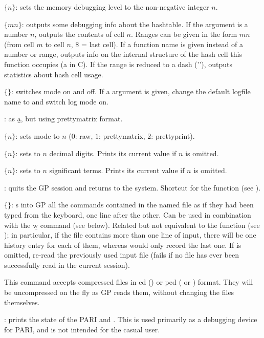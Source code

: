  $\{n\}$: sets the memory debugging level 
to the non-negative integer $n$.

 $\{m$\kbd{-}$n\}$: outputs some debugging info about the
hashtable. If the argument is a number $n$, outputs the contents of cell
$n$. Ranges can be given in the form $m$\kbd{-}$n$ (from cell $m$ to cell
$n$, \$ = last cell). If a function name is given instead of a number or
range, outputs info on the internal structure of the hash cell this
function occupies (a  in C). If the range is reduced to
a dash ('\kbd{-}'), outputs statistics about hash cell usage.

 $\{$$\}$: switches  mode on and off.
If a  argument is given, change the default logfile name to 
 and switch log mode on.

: as \b{a}, but using prettymatrix format.

 $\{n\}$: sets  mode to $n$ ($0$: raw, $1$:
prettymatrix, $2$: prettyprint).

 $\{n\}$: sets  to $n$ decimal
digits. Prints its current value if $n$ is omitted.

 $\{n\}$: sets  to $n$ significant terms.
Prints its current value if $n$ is omitted.

: quits the GP session and returns to the system.
Shortcut for the function  (see ).

 $\{$$\}$: s into GP all the commands
contained in the named file as if they had been typed from the keyboard, one
line after the other. Can be used in combination with the \b{w} command (see
below). Related but not equivalent to the function  (see
); in particular, if the file contains more than one line of
input, there will be one history entry for each of them, whereas 
would only record the last one. If  is omitted, re-read the
previously used input file (fails if no file has ever been successfully read
in the current session).

\unix This command accepts compressed files in ed ()
or ped ( or ) format. They will be uncompressed on
the fly as GP reads them, without changing the files themselves.

: prints the state of the PARI  and .
This is used primarily as a debugging device for PARI, and is not intended
for the casual user.

